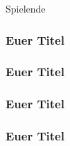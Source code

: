 \begin{frame}
	\begin{center}
		\Huge Spielende
	\end{center}
\end{frame}

\begin{frame}
	\frametitle{Euer Titel}
\end{frame}

\begin{frame}
	\frametitle{Euer Titel}
\end{frame}

\begin{frame}
	\frametitle{Euer Titel}
\end{frame}

\begin{frame}
	\frametitle{Euer Titel}
\end{frame}